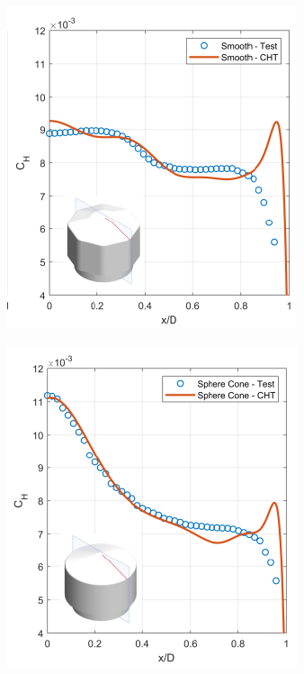 \begin{figure}[ht]
\begin{subfigure}{0.24\textwidth}
        \caption{}
        \label{subfig:b}
    \end{subfigure}
    \hfill
    \begin{subfigure}{0.24\textwidth}
        \includegraphics[width=\textwidth]{Images/2. Background/HATHOR/c.png}
        \caption{}
        \label{subfig:c}
    \end{subfigure}
    \begin{subfigure}{0.24\textwidth}
        \includegraphics[width=\textwidth]{Images/2. Background/HATHOR/d.png}

\end{subfigure}
\end{figure}
